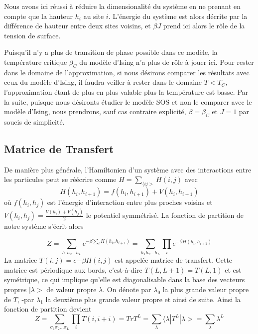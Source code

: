 Nous avons ici réussi à réduire la dimensionalité du système en ne prenant en compte que la hauteur $h_i$ au site $i$. L'énergie du système est alors décrite par la différence de hauteur entre deux sites voisins, et $\beta J$ prend ici alors le rôle de la tension de surface.

Puisqu'il n'y a plus de transition de phase possible dans ce modèle, la température critique $\beta_C$ du modèle d'Ising n'a plus de rôle à jouer ici. Pour rester dans le domaine de l'approximation, si nous désirons comparer les résultats avec ceux du modèle d'Ising, il faudra veiller à rester dans le domaine $T<T_C$, l'approximation étant de plus en plus valable plus la température est basse. Par la suite, puisque nous désironts étudier le modèle SOS et non le comparer avec le modèle d'Ising, nous prendrons, sauf cas contraire explicité, $\beta = \beta_C$ et $J=1$ par soucis de simplicité. 

  \subsection{Matrice de Transfert}

	De manière plus générale, l'Hamiltonien d'un système avec des interactions entre les particules peut se réécrire comme $H = \sum_{\langle ij >} H(i,j)$ avec
\begin{equation*}
  H(h_i,h_{i+1}) = f(h_i,h_{i+1}) + V(h_i,h_{i+1}) 
\end{equation*}
où $f(h_i,h_j)$ est l'énergie d'interaction entre plus proches voisins et $V(h_i,h_j)=\frac{V(h_i)+V(h_j)}{2}$ le potentiel symmétrisé.
La fonction de partition de notre système s'écrit alors 

\begin{equation*}
 Z = \sum_{h_1 h_2 ... h_L} e^{- \beta \sum_{i} H(h_i,h_{i+1})}  
   = \sum_{h_1 h_2 ... h_L} \prod_{i} e^{-\beta H(h_i,h_{i+1})} 
\end{equation*}
La matrice $T(i,j) = e{-\beta H(i,j)}$ est appelée matrice de transfert. Cette matrice est périodique aux bords, c'est-à-dire $T(L,L+1) = T(L,1)$ et est symétrique, ce qui implique qu'elle est diagonalisable dans la base des vecteurs propres $|\lambda >$ de valeur propre $\lambda$. On dénote par $\lambda_0$ la plus grande valeur propre de $T$, -par $\lambda_1$ la deuxième plus grande valeur propre et ainsi de suite.
Ainsi la fonction de partition devient\cite{}
\begin{equation}
  Z = \sum_{\sigma_1 \sigma_2 ... \sigma_{L}} \prod_{i} T(i,i+i) = Tr T^L  = \sum_\lambda \langle\lambda | T^L | \lambda> = \sum_\lambda \lambda^L
\end{equation}

